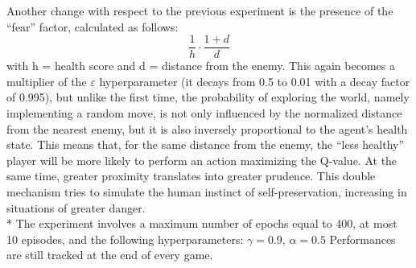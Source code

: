 Another change with respect to the previous experiment is the presence of the ``fear'' factor, calculated as follows:
$$\frac{1}{h}\cdot\frac{1+d}{d}$$
with h = health score and d = distance from the enemy.
This again becomes a multiplier of the $\varepsilon$ hyperparameter (it decays from 0.5 to 0.01 with a decay factor of 0.995), but unlike the first time, the probability of exploring the world, namely implementing a random move, is not only influenced by the normalized distance from the nearest enemy, but it is also inversely proportional to the agent's health state. 
This means that, for the same distance from the enemy, the ``less healthy'' player will be more likely to perform an action maximizing the Q-value. At the same time, greater proximity translates into greater prudence. 
This double mechanism tries to simulate the human instinct of self-preservation, increasing in situations of greater danger.\\*
The experiment involves a maximum number of epochs equal to 400,
at most 10 episodes, and the following hyperparameters: $\gamma = 0.9$, $\alpha = 0.5$
Performances are still tracked at the end of every game.

